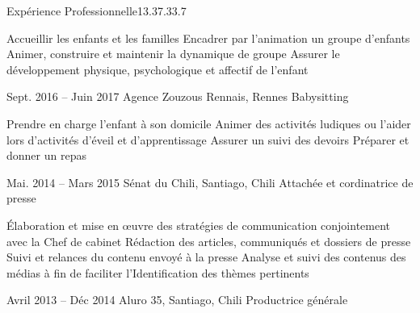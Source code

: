 \documentclass[30pt, french]{tccv}
\begin{document}
\begin{upshape}
\begin{flat_frame}{Expérience Professionnelle}{13.3}{7.3}{3.7}{}
\begin{eventlist}
    \begin{itemize}
      \cvitem[\checkmark] Accueillir les enfants et les familles                      
      \cvitem[\checkmark] Encadrer par l’animation un groupe d’enfants
      \cvitem[\checkmark] Animer, construire et maintenir la dynamique de groupe               
      \cvitem[\checkmark] Assurer le développement physique, psychologique et affectif de l’enfant                                            
    \end{itemize}     




\setlength{\parskip}{0pt}    
\item{Sept. 2016 -- Juin 2017 }     
  {Agence Zouzous Rennais, Rennes}     
  {Babysitting}
     \fontsize{9pt}{1em}\color{text}\bodyfontlight\upshape\selectfont

\begin{itemize}
      \cvitem[\checkmark]  Prendre en charge l’enfant à son domicile                                    
      \cvitem[\checkmark]  Animer des activités ludiques ou l’aider lors d’activités d’éveil et d’apprentissage                                            
      \cvitem[\checkmark]  Assurer un suivi des devoirs
      \cvitem[\checkmark]  Préparer et donner un repas

\end{itemize}       





  
\setlength{\parskip}{0pt}
\item{Mai. 2014 -- Mars 2015 }     
  {Sénat du Chili, Santiago, Chili}     
  {Attachée et cordinatrice de presse}
  \fontsize{9pt}{1em}\color{text}\bodyfontlight\upshape\selectfont

  
\begin{itemize}
      \cvitem[\checkmark] Élaboration et mise en œuvre des stratégies de communication conjointement avec la Chef de cabinet
      \cvitem[\checkmark] Rédaction des articles, communiqués et dossiers de presse
      \cvitem[\checkmark] Suivi et relances du contenu envoyé à la presse
      \cvitem[\checkmark] Analyse et suivi des contenus des médias à fin de faciliter l'Identification des thèmes pertinents
\end{itemize}        




\setlength{\parskip}{0pt}
\item{Avril 2013 -- Déc 2014 }     
  {Aluro 35, Santiago, Chili}     
  {Productrice générale}
\fontsize{9pt}{1em}\color{text}\bodyfontlight\upshape\selectfont


\end{eventlist}
\end{flat_frame}
\end{upshape}
\end{document}
